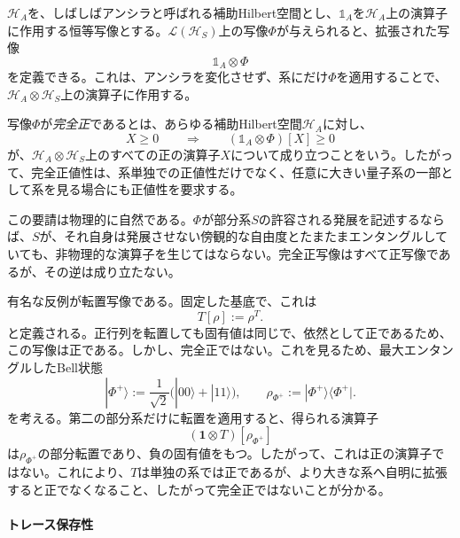 \documentclass[a4paper,11pt,oneside]{article}
\theoremstyle{definition}
\numberwithin{equation}{section}
\begin{document}
$\mathcal H_A$を、しばしばアンシラと呼ばれる補助Hilbert空間とし、$\mathds{1} _A$を$\mathcal H_A$上の演算子に作用する恒等写像とする。$\mathcal L(\mathcal H_S)$上の写像$\Phi$が与えられると、拡張された写像
\begin{equation}
\mathds{1} _A \otimes \Phi
\end{equation}
を定義できる。これは、アンシラを変化させず、系にだけ$\Phi$を適用することで、$\mathcal H_A \otimes \mathcal H_S$上の演算子に作用する。



写像$\Phi$が\textit{完全正}であるとは、あらゆる補助Hilbert空間$\mathcal H_A$に対し、
\begin{equation}
X \geq 0
\qquad \Longrightarrow \qquad
(\mathds{1} _A \otimes \Phi)[X] \geq 0
\end{equation}
が、$\mathcal H_A \otimes \mathcal H_S$上のすべての正の演算子$X$について成り立つことをいう。したがって、完全正値性は、系単独での正値性だけでなく、任意に大きい量子系の一部として系を見る場合にも正値性を要求する。



この要請は物理的に自然である。$\Phi$が部分系$S$の許容される発展を記述するならば、$S$が、それ自身は発展させない傍観的な自由度とたまたまエンタングルしていても、非物理的な演算子を生じてはならない。完全正写像はすべて正写像であるが、その逆は成り立たない。



有名な反例が転置写像である。固定した基底で、これは
\begin{equation}
T[\rho] := \rho^T .
\end{equation}
と定義される。正行列を転置しても固有値は同じで、依然として正であるため、この写像は正である。しかし、完全正ではない。これを見るため、最大エンタングルしたBell状態
\begin{equation}
|\Phi^+\rangle := \frac{1}{\sqrt{2}}\bigl(|00\rangle+|11\rangle\bigr) ,
\qquad
\rho_{\Phi^+}:=|\Phi^+\rangle\langle\Phi^+| .
\end{equation}
を考える。第二の部分系だけに転置を適用すると、得られる演算子
\begin{equation}
(\mathbf{1}\otimes T)[\rho_{\Phi^+}]
\end{equation}
は$\rho_{\Phi^+}$の部分転置であり、負の固有値をもつ。したがって、これは正の演算子ではない。これにより、$T$は単独の系では正であるが、より大きな系へ自明に拡張すると正でなくなること、したがって完全正ではないことが分かる。
\paragraph{トレース保存性}
\end{document}
